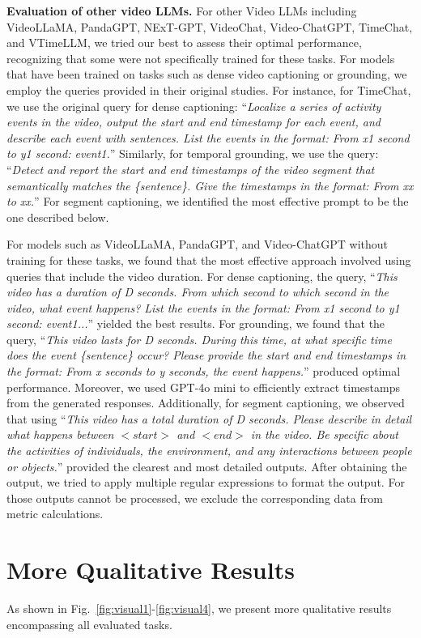 \noindent\textbf{Evaluation of other video LLMs.}
For other Video LLMs including VideoLLaMA, PandaGPT, NExT-GPT, VideoChat, Video-ChatGPT, TimeChat, and VTimeLLM, we tried our best to assess their optimal performance, recognizing that some were not specifically trained for these tasks. 
For models that have been trained on tasks such as dense video captioning or grounding, we employ the queries provided in their original studies. For instance, for TimeChat, we use the original query for dense captioning: ``\textit{Localize a series of activity events in the video, output the start and end timestamp for each event, and describe each event with sentences. List the events in the format: From x1 second to y1 second: event1.}'' 
Similarly, for temporal grounding, we use the query: ``\textit{Detect and report the start and end timestamps of the video segment that semantically matches the \{sentence\}. Give the timestamps in the format: From xx to xx.}'' For segment captioning, we identified the most effective prompt to be the one described below. 

For models such as VideoLLaMA, PandaGPT, and Video-ChatGPT without training for these tasks, we found that the most effective approach involved using queries that include the video duration. For dense captioning, the query, ``\textit{This video has a duration of D seconds. From which second to which second in the video, what event happens? List the events in the format: From x1 second to y1 second: event1...}'' yielded the best results. 
For grounding, we found that the query, ``\textit{This video lasts for D seconds. During this time, at what specific time does the event \{sentence\} occur? Please provide the start and end timestamps in the format: From x seconds to y seconds, the event happens.}'' produced optimal performance. Moreover, we used GPT-4o mini to efficiently extract timestamps from the generated responses.
Additionally, for segment captioning, we observed that using ``\textit{This video has a total duration of D seconds. Please describe in detail what happens between $<start>$ and $<end>$ in the video. Be specific about the activities of individuals, the environment, and any interactions between people or objects.}'' provided the clearest and most detailed outputs. 
After obtaining the output, we tried to apply multiple regular expressions to format the output. For those outputs cannot be processed, we exclude the corresponding data from metric calculations.



\section{More Qualitative Results}
As shown in Fig.~\ref{fig:visual1}-\ref{fig:visual4}, we present more qualitative results encompassing all evaluated tasks. 

